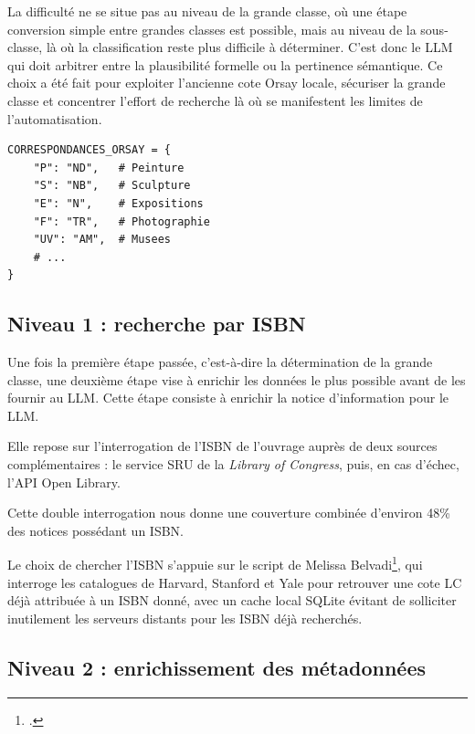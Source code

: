 La difficulté ne se situe pas au niveau de la grande classe, où une étape conversion simple entre grandes classes est possible, mais au niveau de la sous-classe, là où la classification reste plus difficile à déterminer. C'est donc le LLM qui doit arbitrer entre la plausibilité formelle ou la pertinence sémantique. Ce choix a été fait pour exploiter l'ancienne cote Orsay locale, sécuriser la grande classe et concentrer l'effort de recherche là où se manifestent les limites de l'automatisation.





\begin{lstlisting}[caption={Extrait de la table de correspondance Cote Orsay (niveau 0)}, label={lst:correspondances}]
CORRESPONDANCES_ORSAY = {
    "P": "ND",   # Peinture
    "S": "NB",   # Sculpture
    "E": "N",    # Expositions
    "F": "TR",   # Photographie
    "UV": "AM",  # Musees
    # ...
}
\end{lstlisting}

\subsection{Niveau 1 : recherche par ISBN}
\label{sec:niveau1-isbn}

Une fois la première étape passée, c'est-à-dire la détermination de la grande classe, une deuxième étape vise à enrichir les données le plus possible avant de les fournir au LLM. Cette étape consiste à enrichir la notice d'information pour le LLM.

Elle repose sur l'interrogation de l'ISBN de l'ouvrage auprès de deux sources complémentaires : le service SRU de la \textit{Library of Congress}, puis, en cas d'échec, l'API Open Library.

Cette double interrogation nous donne une couverture combinée d'environ 48\%  des notices possédant un ISBN. 

Le choix de chercher l'ISBN s'appuie sur le script  de Melissa Belvadi\footcite{belvadi2023}, qui interroge les catalogues de Harvard, Stanford et Yale pour retrouver une cote LC déjà attribuée à un ISBN donné, avec un cache local SQLite évitant de solliciter inutilement les serveurs distants pour les ISBN déjà recherchés.



\subsection{Niveau 2 : enrichissement des métadonnées}
\label{sec:niveau2}


